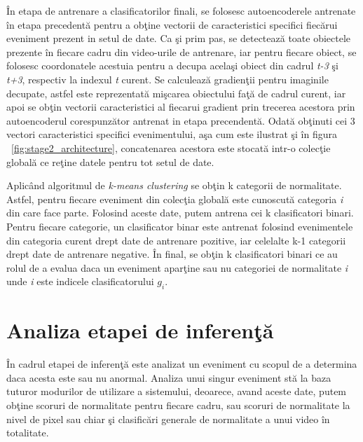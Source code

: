\documentclass[a4paper,12pt]{report}
\begin{document}
\par
În etapa de antrenare a clasificatorilor finali, se folosesc autoencoderele antrenate în etapa precedentă pentru a obţine vectorii de caracteristici specifici fiecărui eveniment prezent in setul de date. Ca şi prim pas, se detectează toate obiectele prezente în fiecare cadru din video-urile  de antrenare, iar pentru fiecare obiect, se folosesc coordonatele acestuia pentru a decupa acelaşi obiect din cadrul \emph{t-3} şi \emph{t+3}, respectiv la indexul \emph{t} curent. Se calculează gradienţii pentru imaginile decupate, astfel este reprezentată mişcarea obiectului faţă de cadrul curent, iar apoi se obţin vectorii caracteristici al fiecarui gradient prin trecerea acestora prin autoencoderul corespunzător antrenat in etapa precendentă. Odată obţinuti cei 3 vectori caracteristici specifici evenimentului, aşa cum este ilustrat şi în figura ~\ref{fig:stage2_architecture}, concatenarea acestora este stocată intr-o colecţie globală ce reţine datele pentru tot setul de date.
\par
Aplicând algoritmul de \emph{k-means clustering} se obţin k categorii de normalitate. Astfel, pentru fiecare eveniment din colecţia globală este cunoscută categoria \emph{i} din care face parte. Folosind aceste date, putem antrena cei k clasificatori binari. Pentru fiecare categorie, un clasificator binar este antrenat folosind evenimentele din categoria curent drept date de antrenare pozitive, iar celelalte k-1 categorii drept date de antrenare negative. În final, se obţin k clasificatori binari ce au rolul de a evalua daca un eveniment aparţine sau nu categoriei de normalitate \emph{i} unde \emph{i} este indicele clasificatorului 
\emph{\(g_{i}\)}. 

\section{Analiza etapei de inferenţă}
În cadrul etapei de inferenţă este analizat un eveniment cu scopul de a determina daca acesta este sau nu anormal. Analiza unui singur eveniment stă la baza tuturor modurilor de utilizare a sistemului, deoarece, avand aceste date, putem obţine scoruri de normalitate pentru fiecare cadru, sau scoruri de normalitate la nivel de pixel sau chiar şi clasificări generale de normalitate a unui video în totalitate.
\end{document}
